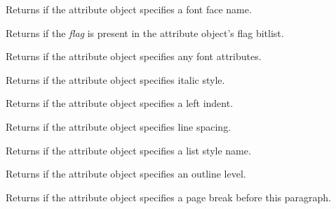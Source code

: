 Returns \true if the attribute object specifies a font face name.

\label{wxrichtextattrhasflag}


Returns \true if the {\it flag} is present in the attribute object's flag bitlist.

\label{wxrichtextattrhasfont}


Returns \true if the attribute object specifies any font attributes.

\label{wxrichtextattrhasitalic}


Returns \true if the attribute object specifies italic style.

\label{wxrichtextattrhasleftindent}


Returns \true if the attribute object specifies a left indent.

\label{wxrichtextattrhaslinespacing}


Returns \true if the attribute object specifies line spacing.

\label{wxrichtextattrhasliststylename}


Returns \true if the attribute object specifies a list style name.

\label{wxrichtextattrhasoutlinelevel}


Returns \true if the attribute object specifies an outline level.

\label{wxrichtextattrhaspagebreak}


Returns \true if the attribute object specifies a page break before this paragraph.

\label{wxrichtextattrhasparagraphspacingafter}

